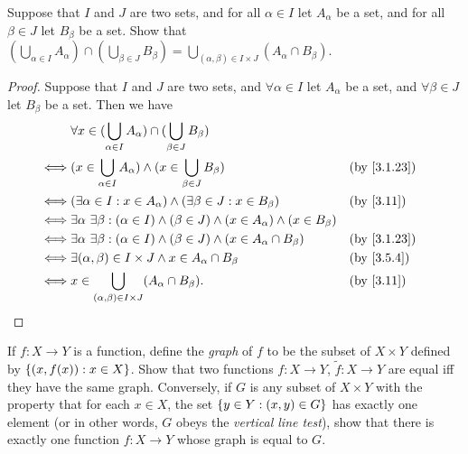 \begin{ex}\label{ex:3.5.9}
	Suppose that \(I\) and \(J\) are two sets, and for all \(\alpha \in I\) let \(A_{\alpha}\) be a set, and for all \(\beta \in J\) let \(B_{\beta}\) be a set.
	Show that \((\bigcup_{\alpha \in I} A_{\alpha}) \cap (\bigcup_{\beta \in J} B_{\beta}) = \bigcup_{(\alpha, \beta) \in I \times J} (A_{\alpha} \cap B_{\beta})\).
\end{ex}

\begin{proof}
	Suppose that \(I\) and \(J\) are two sets, and \(\forall \alpha \in I\) let \(A_{\alpha}\) be a set, and \(\forall \beta \in J\) let \(B_{\beta}\) be a set.
	Then we have
	\begin{align*}
		     & \forall x \in (\bigcup_{\alpha \in I} A_{\alpha}) \cap (\bigcup_{\beta \in J} B_{\beta})                                              \\
		\iff & (x \in \bigcup_{\alpha \in I} A_{\alpha}) \land (x \in \bigcup_{\beta \in J} B_{\beta})                              &  & \by{3.1.23} \\
		\iff & (\exists \alpha \in I : x \in A_{\alpha}) \land (\exists \beta \in J : x \in B_{\beta})                              &  & \by{3.11}   \\
		\iff & \exists \alpha \ \exists \beta : (\alpha \in I) \land (\beta \in J) \land (x \in A_{\alpha}) \land (x \in B_{\beta})                  \\
		\iff & \exists \alpha \ \exists \beta : (\alpha \in I) \land (\beta \in J) \land (x \in A_{\alpha} \cap B_{\beta})          &  & \by{3.1.23} \\
		\iff & \exists (\alpha, \beta) \in I \times J \land x \in A_{\alpha} \cap B_{\beta}                                         &  & \by{3.5.4}  \\
		\iff & x \in \bigcup_{(\alpha, \beta) \in I \times J} (A_{\alpha} \cap B_{\beta}).                                          &  & \by{3.11}
	\end{align*}
\end{proof}

\begin{ex}\label{ex:3.5.10}
	If \(f : X \to Y\) is a function, define the \emph{graph} of \(f\) to be the subset of \(X \times Y\) defined by \(\left\lbrace(x, f(x)) : x \in X\right\rbrace\).
	Show that two functions \(f : X \to Y\), \(\tilde{f} : X \to Y\) are equal iff they have the same graph.
	Conversely, if \(G\) is any subset of \(X \times Y\) with the property that for each \(x \in X\), the set \(\left\lbrace y \in Y : (x, y) \in G\right\rbrace\) has exactly one element (or in other words, \(G\) obeys the \emph{vertical line test}), show that there is exactly one function \(f : X \to Y\) whose graph is equal to \(G\).
\end{ex}

